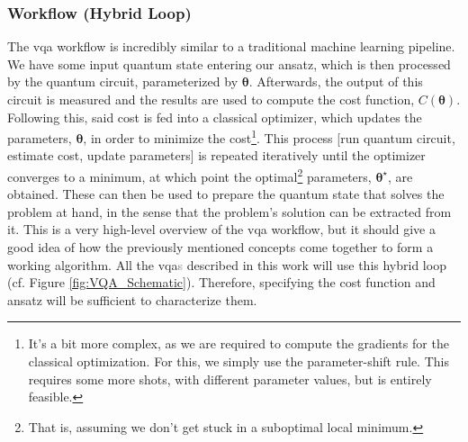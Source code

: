 \subsubsection*{\small Workflow (Hybrid Loop)}
The \acrshort{vqa} workflow is incredibly similar to a traditional machine learning pipeline. We have some input quantum state entering our ansatz, which is then processed by the quantum circuit, parameterized by $\boldsymbol{\theta}$. Afterwards, the output of this circuit is measured and the results are used to compute the cost function, $C(\boldsymbol{\theta})$. Following this, said cost is fed into a classical optimizer, which updates the parameters, $\boldsymbol{\theta}$, in order to minimize the cost\footnote{It's a bit more complex, as we are required to compute the gradients for the classical optimization. For this, we simply use the parameter-shift rule. This requires some more shots, with different parameter values, but is entirely feasible.}. This process [run quantum circuit, estimate cost, update parameters] is repeated iteratively until the optimizer converges to a minimum, at which point the optimal\footnote{That is, assuming we don't get stuck in a suboptimal local minimum.} parameters, $\boldsymbol{\theta}^{\star}$, are obtained. These can then be used to prepare the quantum state that solves the problem at hand, in the sense that the problem's solution can be extracted from it. This is a very high-level overview of the \acrshort{vqa} workflow, but it should give a good idea of how the previously mentioned concepts come together to form a working algorithm. All the \acrshort{vqa}\textcolor{gray}{s} described in this work will use this hybrid loop (cf. Figure \ref{fig:VQA_Schematic}). Therefore, specifying the cost function and ansatz will be sufficient to characterize them.

